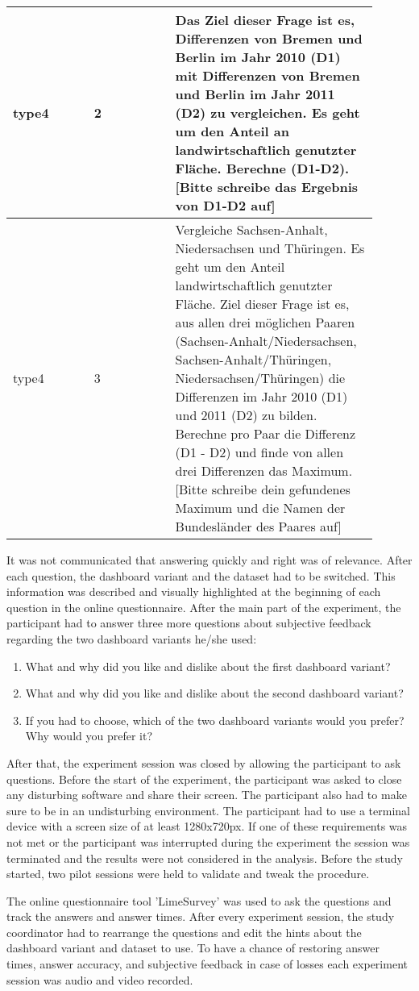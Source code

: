 \begin{longtable}{| p{0.20\linewidth} | p{0.20\linewidth} | p{0.50\linewidth}|}
    \hline
    type4 & 2 & \parbox{\linewidth}{\vspace{4pt} Das Ziel dieser Frage ist es, Differenzen von Bremen und Berlin im Jahr 2010 (D1) mit Differenzen von Bremen und Berlin im Jahr 2011 (D2) zu vergleichen. Es geht um den Anteil an landwirtschaftlich genutzter Fläche. Berechne (D1-D2). [Bitte schreibe das Ergebnis von D1-D2 auf]} \\
    \hline
    type4 & 3 & \parbox{\linewidth}{\vspace{4pt} Vergleiche Sachsen-Anhalt, Niedersachsen und Thüringen. Es geht um den Anteil landwirtschaftlich genutzter Fläche. Ziel dieser Frage ist es, aus allen drei möglichen Paaren (Sachsen-Anhalt/Niedersachsen, Sachsen-Anhalt/Thüringen, Niedersachsen/Thüringen) die Differenzen im Jahr 2010 (D1) und 2011 (D2) zu bilden. Berechne pro Paar die Differenz (D1 - D2) und finde von allen drei Differenzen das Maximum. [Bitte schreibe dein gefundenes Maximum und die Namen der Bundesländer des Paares auf]} \\
\end{longtable}
It was not communicated that answering quickly and right was of relevance. After each question, the dashboard variant and the dataset had to
be switched. This information was described and visually highlighted at the beginning of each question in the online questionnaire. After the
main part of the experiment, the participant had to answer three more questions about subjective feedback regarding the two dashboard variants
he/she used:
\begin{enumerate}
    \item What and why did you like and dislike about the first dashboard variant?
    \item What and why did you like and dislike about the second dashboard variant?
    \item If you had to choose, which of the two dashboard variants would you prefer? Why would you prefer it?
\end{enumerate}
After that, the experiment session was closed by allowing the participant to ask questions. Before the start of the experiment, the 
participant was asked to close any disturbing software and share their screen. The participant also had to make sure to be in an 
undisturbing environment. The participant had to use a terminal device with a screen size of at least 1280x720px. If one of these requirements
was not met or the participant was interrupted during the experiment the session was terminated and the results were not considered in the
analysis. Before the study started, two pilot sessions were held to validate and tweak the procedure.

The online questionnaire tool 'LimeSurvey' was used to ask the questions and track the answers and answer times. After every experiment session,
the study coordinator had to rearrange the questions and edit the hints about the dashboard variant and dataset to use. To have a chance of
restoring answer times, answer accuracy, and subjective feedback in case of losses each experiment session was audio and video recorded.